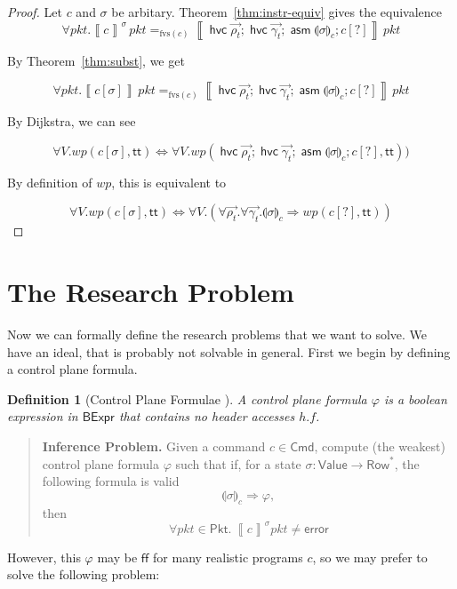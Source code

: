 \documentclass{article}
\newcommand{\pkt}{\mathit{pkt}}
\newcommand{\error}{\mathsf{error}}
\newcommand{\denote}[1]{\left\llbracket#1\right\rrbracket}
\newcommand{\TRUE}{\mathsf{tt}}
\newcommand{\FALSE}{\mathsf{ff}}
\newcommand{\Value}{\mathsf{Value}}
\newcommand{\BExpr}{\mathsf{BExpr}}
\newcommand{\Cmd}{\mathsf{Cmd}}
\newcommand{\Pkt}{\mathsf{Pkt}}
\newcommand{\Row}{\mathsf{Row}}
\newcommand{\assume}{\mathop{\mathsf{asm}}}
\newcommand{\havoc}[1]{\mathop{\mathsf{hvc}}#1}
\newcommand{\WP}{\textit{wp}}
\newcommand{\state}[1]{\llparenthesis#1\rrparenthesis}
\newcommand{\instr}{[?]}
\newcommand{\fvs}{\textrm{fvs}}
\newtheorem{definition}{Definition}
\begin{document}
\begin{proof}
  Let $c$ and $\sigma$ be arbitary.
  Theorem~\ref{thm:instr-equiv} gives the equivalence
  \[\forall \pkt. \denote{c}^\sigma\,\pkt =_{\fvs(c)} \denote{\havoc \vec{\rho_t}; \havoc{\vec{\gamma_t}}; \assume{\state\sigma_c}; c\instr}\,\pkt\]

  By Theorem~\ref{thm:subst}, we get

  \[\forall \pkt.\denote{c[\sigma]}\,\pkt =_{\fvs(c)}  \denote{\havoc \vec{\rho_t}; \havoc{\vec{\gamma_t}}; \assume{\state\sigma_c}; c\instr}\,\pkt\]

  By Dijkstra, we can see

  \[\forall V. \WP(c[\sigma], \TRUE) \iff \forall V. \WP(\havoc \vec{\rho_t}; \havoc{\vec{\gamma_t}}; \assume{\state\sigma_c}; c\instr, \TRUE))\]

  By definition of $\WP$, this is equivalent to

  \[ \forall V. \WP(c[\sigma],\TRUE) \iff \forall V. \left(\forall \vec{\rho_t}.\forall \vec{\gamma_t}.\state\sigma_c \Rightarrow \WP(c\instr, \TRUE)\right)\]

\end{proof}


\clearpage
\section{The Research Problem}

Now we can formally define the research problems that we want to solve. We have
an ideal, that is probably not solvable in general. First we begin by defining a control plane formula.

\begin{definition}[Control Plane Formulae ]
  A control plane formula $\varphi$ is a boolean expression in $\BExpr$ that
  contains no header accesses $h.f$.
\end{definition}

\begin{quote}
  \textbf{Inference Problem.} Given a command $c \in \Cmd$, compute (the
  weakest) control plane formula $\varphi$ such that if, for a state $\sigma :
  \Value \to \Row^*$, the following formula is valid \[\state\sigma_c
  \Rightarrow \varphi,\] then \[\forall \pkt \in \Pkt.~ \denote{c}^\sigma\pkt \neq \error \]
\end{quote}

However, this $\varphi$ may be $\FALSE$ for many realistic programs $c$, so we may
prefer to solve the following problem:
\end{document}
